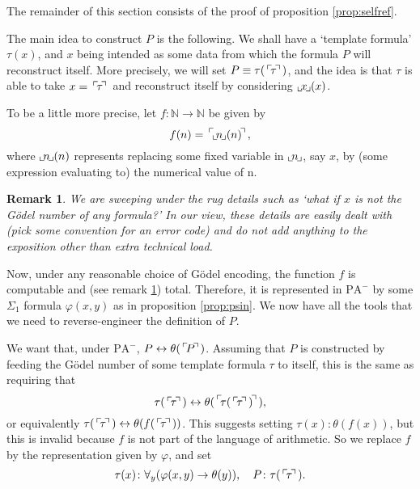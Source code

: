 \documentclass{article}
\newtheorem{remark}[theorem]{Remark}
\theoremstyle{nonumberplain}
\newcommand{\N}{\mathbb{N}}
\newcommand{\PA}{\mathrm{PA}}
\newcommand{\WPA}{\PA^-}
\newcommand{\gn}[1]{\setbox0=\hbox{$\mathclap{\phantom{t}}#1$} \dimen0=\ht0 \advance\dimen0 by -1.25ex \,\raise\dimen0\hbox{$\ulcorner$} \! \box0 \! \raise\dimen0\hbox{$\urcorner$}\,}
\newcommand{\gf}[1]{\raise-0.25ex\hbox{$\llcorner$}\! #1 \!\raise-0.25ex\hbox{$\lrcorner$}}
\begin{document}
The remainder of this section consists of the proof of proposition \ref{prop:selfref}.

\smallskip

The main idea to construct $P$ is the following. We shall have a `template formula' $\tau(x)$, and $x$ being intended as some data from which the formula $P$ will reconstruct itself. More precisely, we will set $P \equiv \tau(\gn\tau)$, and the idea is that $\tau$ is able to take $x = \gn\tau$ and reconstruct itself by considering $\gf{x}(x)$.

To be a little more precise, let $f \colon \N \to \N$ be given by
\begin{equation}
f(n) = \gn{\gf{n}(n)},
\end{equation}
where $\gf{n}(n)$ represents replacing some fixed variable in $\gf{n}$, say $x$, by (some expression evaluating to) the numerical value of n.

\begin{remark}\label{rmk:rug}
We are sweeping under the rug details such as `what if $x$ is not the Gödel number of any formula?' In our view, these details are easily dealt with (pick some convention for an error code) and do not add anything to the exposition other than extra technical load.
\end{remark}

Now, under any reasonable choice of Gödel encoding, the function $f$ is computable and (see remark \ref{rmk:rug}) total. Therefore, it is represented in $\WPA$ by some $\Sigma_1$ formula $\varphi(x,y)$ as in proposition \ref{prop:psin}. We now have all the tools that we need to reverse-engineer the definition of $P$.

We want that, under $\WPA$, $P \leftrightarrow \theta(\gn P)$. Assuming that $P$ is constructed by feeding the Gödel number of some template formula $\tau$ to itself, this is the same as requiring that
\begin{equation}
\tau(\gn\tau) \leftrightarrow \theta(\gn{\tau(\gn\tau)}),
\end{equation}
or equivalently $\tau(\gn\tau) \leftrightarrow \theta(f(\gn\tau))$. This suggests setting $\tau(x) \colon \theta(f(x))$, but this is invalid because $f$ is not part of the language of arithmetic. So we replace $f$ by the representation given by $\varphi$, and set
\begin{equation}
\tau(x) \colon \forall_y(\varphi(x,y) \rightarrow \theta(y)), \quad P \colon \tau(\gn\tau).
\end{equation}
\end{document}
